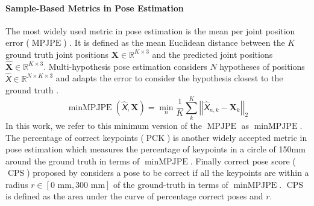 \documentclass{article} \usepackage{iclr2023_conference,times}
\def\mX{{\bm{X}}}
\newcommand{\tens}[1]{\bm{\mathsfit{#1}}}
\def\tX{{\tens{X}}}
\newcommand{\R}{\mathbb{R}}
\begin{document}
\paragraph{Sample-Based Metrics in Pose Estimation} The most widely used metric in pose estimation is the mean per joint position error ($\operatorname{MPJPE}$) \citep{Wang2021-ps}.
It is defined as the mean Euclidean distance between the $K$ ground truth joint positions $\mX \in \R^{K\times3}$ and the predicted joint positions $\hat{\mX} \in \R^{K\times3}$.
Multi-hypothesis pose estimation considers $N$ hypotheses of positions $\hat{\tX} \in \R^{N \times K\times3}$ and adapts the error to consider the hypothesis closest to the ground truth \citep{Jahangiri2017-aq}.
\begin{equation*}
    \operatorname{minMPJPE}(\hat{\tX}, \mX) = \min_n \frac{1}{K} \sum_k^K \left|\left|\hat{\tX}_{n,k} - \mX_k\right|\right|_2
\end{equation*}
In this work, we refer to this minimum version of the $\operatorname{MPJPE}$ as $\operatorname{minMPJPE}$.
The percentage of correct keypoints ($\operatorname{PCK}$) \citep{Toshev2013-vi, Tompson2014-wh, Mehta2016-ji} is another widely accepted metric in pose estimation which measures the percentage of keypoints in a circle of 150mm around the ground truth in terms of $\operatorname{minMPJPE}$. Finally correct pose score ($\operatorname{CPS}$) proposed by \citet{Wandt2021Canonpose} considers a pose to be correct if all the keypoints are within a radius $r \in [0\textrm{ mm}, 300\textrm{ mm}]$ of the ground-truth in terms of $\operatorname{minMPJPE}$. $\operatorname{CPS}$ is defined as the area under the curve of percentage correct poses and $r$.
\end{document}
